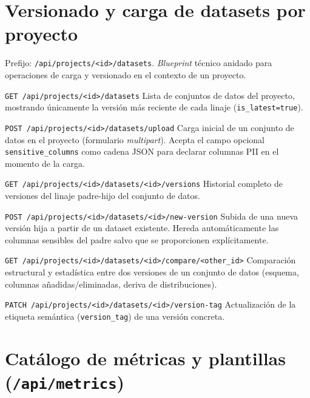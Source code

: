 \section{Versionado y carga de datasets por proyecto}
\label{sec:api-project-datasets}

Prefijo: \texttt{/api/projects/<id>/datasets}.  \emph{Blueprint} técnico
anidado para operaciones de carga y versionado en el contexto de un
proyecto.

\begin{definitionlist}
  \item[\texttt{GET /api/projects/<id>/datasets}]  Lista de conjuntos de
    datos del proyecto, mostrando únicamente la versión más reciente de cada
    linaje (\texttt{is\_latest=true}).

  \item[\texttt{POST /api/projects/<id>/datasets/upload}]  Carga inicial de
    un conjunto de datos en el proyecto (formulario \emph{multipart}).
    Acepta el campo opcional \texttt{sensitive\_columns} como cadena
    \ac{JSON} para declarar columnas \ac{PII} en el momento de la carga.

  \item[\texttt{GET /api/projects/<id>/datasets/<id>/versions}]  Historial
    completo de versiones del linaje padre-hijo del conjunto de datos.

  \item[\texttt{POST /api/projects/<id>/datasets/<id>/new-version}]  Subida
    de una nueva versión hija a partir de un dataset existente.  Hereda
    automáticamente las columnas sensibles del padre salvo que se
    proporcionen explícitamente.

  \item[\texttt{GET /api/projects/<id>/datasets/<id>/compare/<other\_id>}]
    Comparación estructural y estadística entre dos versiones de un
    conjunto de datos (esquema, columnas añadidas/eliminadas, deriva de
    distribuciones).

  \item[\texttt{PATCH /api/projects/<id>/datasets/<id>/version-tag}]
    Actualización de la etiqueta semántica (\texttt{version\_tag}) de una
    versión concreta.
\end{definitionlist}


\section{Catálogo de métricas y plantillas (\texttt{/api/metrics})}
\label{sec:api-metrics}

